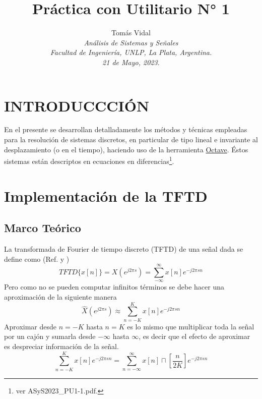 \documentclass[letterpaper, 10 pt, conference]{ieeeconf}  %
\title{\LARGE \bf Pr\'actica con Utilitario N° 1}
\author{
  Tom\'as Vidal\\
  {\it An\'alisis de Sistemas y Se\~{n}ales}\\
  {\it Facultad de Ingenier\'ia, UNLP, La Plata, Argentina.}\\
  {\it 21 de Mayo, 2023.}
}
\begin{document}
\maketitle
\thispagestyle{empty}
\pagestyle{empty}

\section{INTRODUCCCI\'ON}
En el presente se desarrollan detalladamente los m\'etodos y t\'ecnicas empleadas para la resoluci\'on de sistemas discretos, en particular de tipo lineal e invariante al desplazamiento (o en el tiempo), haciendo uso de la herramienta \href{https://octave.org/}{Octave}. \'Estos sistemas est\'an descriptos en ecuaciones en diferencias\footnote{ver ASyS2023\_PU1-1.pdf.}.

\section{Implementaci\'on de la TFTD}
\subsection{Marco Te\'orico} \label{subsec:TFTD}
La transformada de Fourier de tiempo discreto (TFTD) de una se\~{n}al dada se define como (Ref. \cite{tftd_tp5} y \cite{tftd_teoria})
\[
  TFTD\{x[n]\} = X(e^{j2{\pi}s}) = \sum_{-\infty}^{\infty}{x[n]e^{-j2{\pi}sn}}
\]
Pero como no se pueden computar infinitos t\'erminos se debe hacer una aproximaci\'on de la siguiente manera
\[
  \hat{X}(e^{j2{\pi}s}) \approx \sum_{n=-K}^{K}{x[n]e^{-j2{\pi}sn}}
\]
Aproximar desde $n=-K$ hasta $n=K$ es lo mismo que multiplicar toda la se\~nal por un caj\'on y sumarla desde $-\infty$ hasta $\infty$, es decir que el efecto de aproximar es despreciar informaci\'on de la se\~nal.
\[
  \sum_{n=-K}^{K}{x[n]e^{-j2{\pi}sn}} = \sum_{n=-\infty}^{\infty}{x[n]\sqcap[\frac{n}{2K}]e^{-j2{\pi}sn}}
\]
\end{document}
